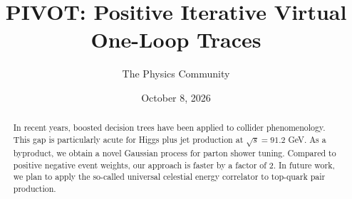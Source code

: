 \documentclass[11pt]{article}
\title{PIVOT: Positive Iterative Virtual One-Loop Traces}
\author{The Physics Community}
\date{October 8, 2026}
\numberwithin{equation}{section}
\theoremstyle{definition}
\theoremstyle{remark}
\begin{document}
\maketitle
\begin{abstract}
In recent years, boosted decision trees have been applied to collider
phenomenology. This gap is particularly acute for Higgs plus jet
production at $\sqrt{s} = 91.2$ GeV. As a byproduct, we obtain a novel
Gaussian process for parton shower tuning. Compared to positive negative
event weights, our approach is faster by a factor of 2. In future work,
we plan to apply the so-called universal celestial energy correlator to
top-quark pair production.
\end{abstract}
\tableofcontents




\nocite{*}


\end{document}
